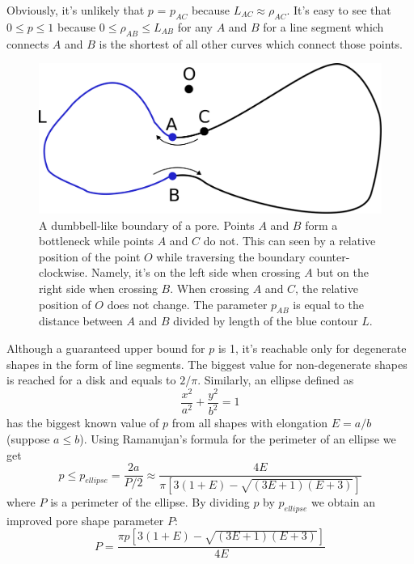\documentclass[reprint,amsmath,amssymb,aps,pre,showkeys,showpacs]{revtex4-1}
\begin{document}
Obviously, it's unlikely that $p$ = $p_{AC}$ because $L_{AC} \approx \rho_{AC}$.
It's easy to see that $0 \le p \le 1$ because $0 \le \rho_{AB} \le L_{AB}$ for
any $A$ and $B$ for a line segment which connects $A$ and $B$ is the shortest
of all other curves which connect those points.
\begin{figure}
  \centering
  \includegraphics[width=0.9\linewidth]{images/parameter.png}
  \caption[]{A dumbbell-like boundary of a pore. Points $A$ and $B$ form a
    bottleneck while points $A$ and $C$ do not. This can seen by a relative
    position of the point $O$ while traversing the boundary
    counter-clockwise. Namely, it's on the left side when crossing $A$ but on
    the right side when crossing $B$. When crossing $A$ and $C$, the relative
    position of $O$ does not change. The parameter $p_{AB}$ is equal to the
    distance between $A$ and $B$ divided by length of the blue contour $L$.}
  \label{fig:parameter}
\end{figure}

Although a guaranteed upper bound for $p$ is 1, it's reachable only for
degenerate shapes in the form of line segments. The biggest value for
non-degenerate shapes is reached for a disk and equals to $2/\pi$. Similarly, an
ellipse defined as
\begin{equation*}
  \frac{x^2}{a^2} + \frac{y^2}{b^2} = 1
\end{equation*}
has the biggest known value of $p$ from all shapes with elongation $E = a / b$
(suppose $a \le b$). Using Ramanujan's formula for the perimeter of an ellipse
we get
\begin{equation*}
  p \le p_{ellipse} = \frac{2a}{P/2} \approx \frac{4E}{\pi[3(1+E) - \sqrt{(3E+1)(E+3)}]}
\end{equation*}
where $P$ is a perimeter of the ellipse. By dividing $p$ by $p_{ellipse}$ we
obtain an improved pore shape parameter $P$:
\begin{equation*}
  P = \frac{\pi p [3(1+E) - \sqrt{(3E+1)(E+3)}]}{4E}
\end{equation*}
\end{document}
